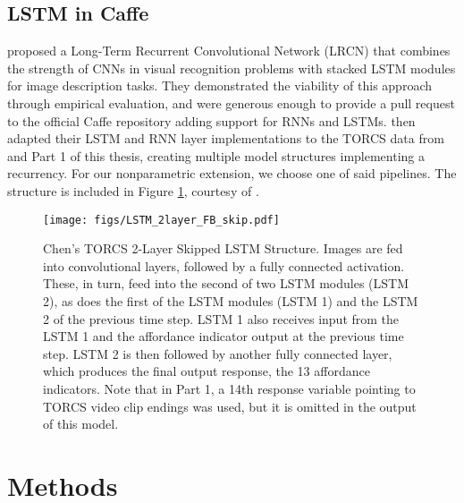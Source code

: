 \documentclass[master]{subfiles}
\begin{document}
\subsection{LSTM in Caffe}
\cite{lrcn2014} proposed a Long-Term Recurrent Convolutional Network (LRCN) that combines the strength of CNNs in visual recognition problems with stacked LSTM modules for image description tasks.  They demonstrated the viability of this approach through empirical evaluation, and were generous enough to provide a pull request to the official Caffe repository adding support for RNNs and LSTMs.  \cite{chenyi_phd} then adapted their LSTM and RNN layer implementations to the TORCS data from \cite{deepdriving} and Part 1 of this thesis, creating multiple model structures implementing a recurrency.  For our nonparametric extension, we choose one of said pipelines.  The structure is included in Figure \ref{fig:chenyi_lstm}, courtesy of \cite{chenyi_phd}.
\begin{landscape}
 \begin{figure}
  \centering
  \texttt{[image: figs/LSTM\_2layer\_FB\_skip.pdf]}
  \caption{Chen's TORCS 2-Layer Skipped LSTM Structure.  Images are fed into convolutional layers, followed by a fully connected activation.  These, in turn, feed into the second of two LSTM modules (LSTM 2), as does the first of the LSTM modules (LSTM 1) and the LSTM 2 of the previous time step.  LSTM 1 also receives input from the LSTM 1 and the affordance indicator output at the previous time step.  LSTM 2 is then followed by another fully connected layer, which produces the final output response, the 13 affordance indicators.  Note that in Part 1, a 14th response variable pointing to TORCS video clip endings was used, but it is omitted in the output of this model.}
  \label{fig:chenyi_lstm}
 \end{figure}
\end{landscape}
\section{Methods}
\end{document}
